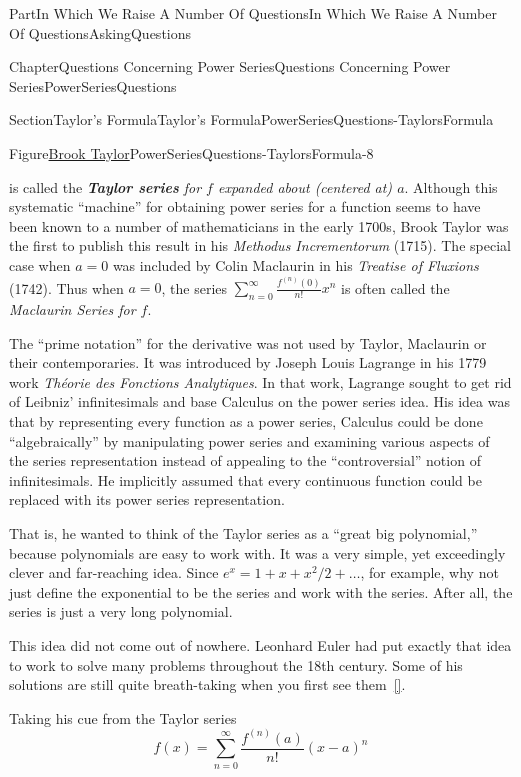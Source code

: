 \documentclass[oneside,10pt,]{book}
\newcommand{\xreffont}{\relax}
\newcommand{\alert}[1]{\textbf{\textit{#1}}}
\numberwithin{equation}{part}
\begin{document}
\begin{partptx}{Part}{In Which We Raise A Number Of Questions}{}{In Which We Raise A Number Of Questions}{}{}{AskingQuestions}
\begin{chapterptx}{Chapter}{Questions Concerning Power Series}{}{Questions Concerning Power Series}{}{}{PowerSeriesQuestions}
\begin{sectionptx}{Section}{Taylor's Formula}{}{Taylor's Formula}{}{}{PowerSeriesQuestions-TaylorsFormula}
\begin{figureptx}{Figure}{\href{https://mathshistory.st-andrews.ac.uk/Biographies/Taylor/}{Brook Taylor}\protect\footnotemark{}}{PowerSeriesQuestions-TaylorsFormula-8}{}
\begin{image}{0.325}{0.35}{0.325}{}
\end{image}%
\tcblower
\end{figureptx}%
%
is called the \emph{\alert{Taylor series} for \(f\) expanded about (centered at) \(a\)}.  Although this systematic ``machine'' for obtaining power series for a function seems to have been known to a number of mathematicians in the early 1700s, Brook Taylor was the first to publish this result in his \textit{Methodus Incrementorum} (1715). The special case when \(a=0\) was included by Colin Maclaurin in his \emph{Treatise of Fluxions} (1742).  Thus when \(a=0\), the series \(\sum_{n=0}^\infty\frac{f^{(n)}(0)}{n!}x^n\) is often called the \emph{Maclaurin Series for \(f\)}.%
\par
The ``prime notation'' for the derivative was not used by Taylor, Maclaurin or their contemporaries. It was introduced by Joseph Louis Lagrange in his 1779 work \textit{Théorie des Fonctions Analytiques}. In that work, Lagrange sought to get rid of Leibniz' infinitesimals and base Calculus on the power series idea. His idea was that by representing every function as a power series, Calculus could be done ``algebraically'' by manipulating power series and examining various aspects of the series representation instead of appealing to the ``controversial'' notion of infinitesimals. He implicitly assumed that every continuous function could be replaced with its power series representation.%
\par
That is, he wanted to think of the Taylor series as a ``great big polynomial,'' because polynomials are easy to work with. It was a very simple, yet exceedingly clever and far-reaching idea. Since \(e^x = 1 +x +x^2/2 +\ldots\), for example, why not just define the exponential to be the series and work with the series. After all, the series is just a very long polynomial.%
\par
This idea did not come out of nowhere.  Leonhard Euler had put exactly that idea to work to solve many problems throughout the 18th century.  Some of his solutions are still quite breath-taking when you first see them~\hyperlink{sandifer07__early_mathem_leonar_euler}{[{\xreffont 14}]}.%
\par
Taking his cue from the Taylor series%
\begin{equation*}
f(x) = \sum_{n=0}^\infty\frac{f^{(n)}(a)}{n!}(x-a)^n
\end{equation*}
%

\end{sectionptx}
\end{chapterptx}
\end{partptx}
\end{document}
